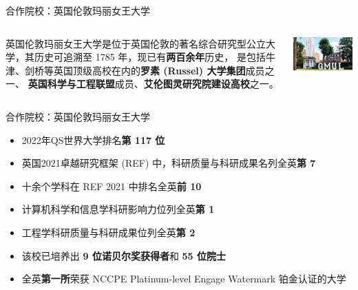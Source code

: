 \documentclass[aspectratio=169, utf8, fontset=windows]{beamer}
\begin{document}
\begin{frame}{合作院校：英国伦敦玛丽女王大学}
    \begin{columns}
        \setlength{\parindent}{2em}

        英国伦敦玛丽女王大学是位于英国伦敦的著名综合研究型公立大学，其历史可追溯至 1785 年，现已有\textcolor{Fore}{\textbf{两百余年}}历史，
        是包括牛津、剑桥等英国顶级高校在内的\textcolor{Fore}{\textbf{罗素 (Russel) 大学集团}}成员之一、
        \textcolor{Fore}{\textbf{英国科学与工程联盟}}成员、\textcolor{Fore}{\textbf{艾伦图灵研究院建设高校}}之一。

        \includegraphics[width=\textwidth]{./resources/14.jpg}
    \end{columns}
\end{frame}

\begin{frame}{合作院校：英国伦敦玛丽女王大学}
    \begin{itemize}
        \item 2022年QS世界大学排名\textcolor{Fore}{\textbf{第 117 位}}
        \item 英国2021卓越研究框架 (REF) 中，科研质量与科研成果名列全英\textcolor{Fore}{\textbf{第 7}}
        \item 十余个学科在 REF 2021 中排名全英\textcolor{Fore}{\textbf{前 10}}
        \item 计算机科学和信息学科研影响力位列全英\textcolor{Fore}{\textbf{第 1}}
        \item 工程学科研质量与科研成果位列全英\textcolor{Fore}{\textbf{第 2}}
        \item 该校已培养出 \textcolor{Fore}{\textbf{9 位诺贝尔奖获得者}}和 \textcolor{Fore}{\textbf{55 位院士}}
        \item 全英\textcolor{Fore}{\textbf{第一所}}荣获 NCCPE Platinum-level Engage Watermark 铂金认证的大学
    \end{itemize}
\end{frame}
\end{document}
